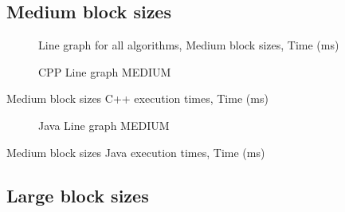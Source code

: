 %         
%
%         

%     

\subsection{Medium block sizes}
\begin{figure}
    \centering
    \caption{Line graph for all algorithms, Medium block sizes, Time (ms)}
    \label{fig:all:line:medium}
    
\end{figure}

\begin{figure}
    \centering
    \label{fig:cpp:line:medium}
    \caption{CPP Line graph MEDIUM}
    
\end{figure}
\begin{table}
    \centering
    \label{tab:cpp:medium}
    \caption{Medium block sizes C++ execution times, Time (ms)}
    \resizebox{\columnwidth}{!}{
        
    }
\end{table}


\begin{figure}
    \centering
    \label{fig:java:line:medium}
    \caption{Java Line graph MEDIUM}
    
\end{figure}
\begin{table}
    \centering
    \label{tab:java:medium}
    \caption{Medium block sizes Java execution times, Time (ms)}
    \resizebox{\columnwidth}{!}{
        
    }
\end{table}

\subsection{Large block sizes}

